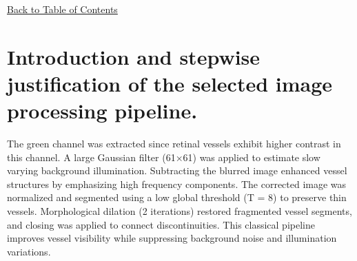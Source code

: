 \documentclass[12pt,a4paper]{article}
\begin{document}
\begin{center}
\end{center}

\hyperref[contents]{\small Back to Table of Contents}
\newpage

\section*{Introduction and stepwise justification of the selected image processing pipeline.}

The green channel was extracted since retinal vessels exhibit higher contrast in this channel. A large Gaussian filter (61×61) was applied to estimate slow varying background illumination. Subtracting the blurred image enhanced vessel structures by emphasizing high frequency components. The corrected image was normalized and segmented using a low global threshold (T = 8) to preserve thin vessels. Morphological dilation (2 iterations) restored fragmented vessel segments, and closing was applied to connect discontinuities. This classical pipeline improves vessel visibility while suppressing background noise and illumination variations.
\end{document}
